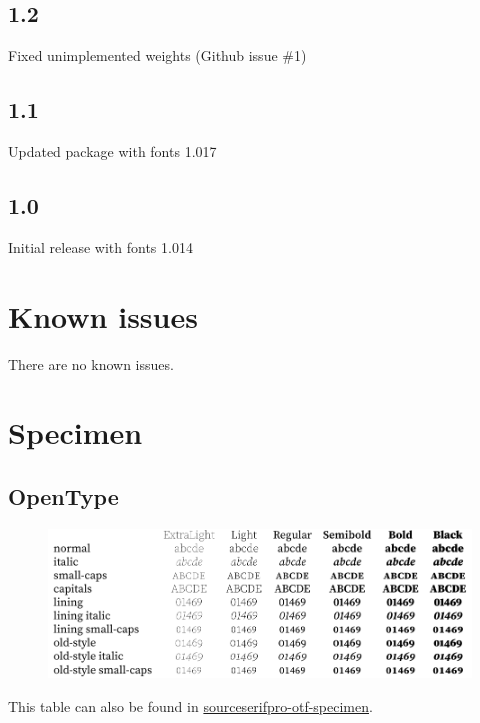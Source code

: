 \documentclass[10pt,a4paper,english]{article}
\newcommand*\file[1]{\href{run:#1.pdf}{#1}}
\begin{document}
\begin{multicols}{2}
\subsection*{1.2}
\begin{itemize*}
	\item Fixed unimplemented weights (Github issue \#1)
\end{itemize*}

\subsection*{1.1}
\begin{itemize*}
	\item Updated package with fonts 1.017
\end{itemize*}

\subsection*{1.0}
\begin{itemize*}
	\item Initial release with fonts 1.014
\end{itemize*}

\section{Known issues}
\begin{itemize*}
	\item There are no known issues.
\end{itemize*}
\vspace{0pt plus 1filll}\mbox{}
\newpage
\end{multicols}

\section{Specimen}
\label{sec:specimen}
\subsection{OpenType}
\begin{figure}[ht]
	\centering
	\includegraphics{sourceserifpro-otf-specimen}
\end{figure}
This table can also be found in \file{sourceserifpro-otf-specimen}.
\end{document}
